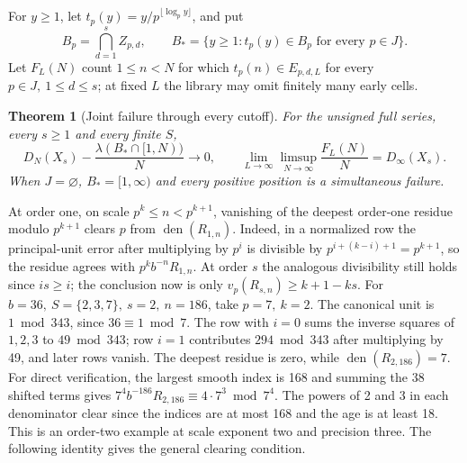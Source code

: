 \documentclass[11pt]{article}
\newtheorem{theorem}{Theorem}[section]
\newcommand{\vol}{\lambda}
\newcommand{\dd}{D_{\infty}}
\newcommand{\den}{\operatorname{den}}
\begin{document}
For \(y\ge1\), let \(t_p(y)=y/p^{\lfloor\log_p y\rfloor}\), and put
\[
 B_p=\bigcap_{d=1}^s Z_{p,d},\qquad
 B_*=\{y\ge1:t_p(y)\in B_p\text{ for every }p\in J\}.
\]
Let \(F_L(N)\) count \(1\le n<N\) for which \(t_p(n)\in E_{p,d,L}\) for every \(p\in J,\ 1\le d\le s\); at fixed \(L\) the library may omit finitely many early cells.

\begin{theorem}[Joint failure through every cutoff]\label{thm:joint}
For the unsigned full series, every \(s\ge1\) and every finite \(S\),
\begin{equation}\label{eq:joint}
 D_N(X_s)-\frac{\vol(B_*\cap[1,N))}{N}\longrightarrow0,\qquad
 \lim_{L\to\infty}\limsup_{N\to\infty}\frac{F_L(N)}N=\dd(X_s).
\end{equation}
When \(J=\varnothing\), \(B_*=[1,\infty)\) and every positive position is a simultaneous failure.
\end{theorem}

At order one, on scale \(p^k\le n<p^{k+1}\), vanishing of the deepest order-one residue modulo \(p^{k+1}\) clears \(p\) from \(\den(R_{1,n})\). Indeed, in a normalized row the principal-unit error after multiplying by \(p^i\) is divisible by \(p^{i+(k-i)+1}=p^{k+1}\), so the residue agrees with \(p^kb^{-n}R_{1,n}\). At order \(s\) the analogous divisibility still holds since \(is\ge i\); the conclusion now is only \(v_p(R_{s,n})\ge k+1-ks\). For \(b=36,\ S=\{2,3,7\},\ s=2,\ n=186\), take \(p=7,\ k=2\). The canonical unit is \(1\bmod343\), since \(36\equiv1\bmod7\). The row with \(i=0\) sums the inverse squares of \(1,2,3\) to \(49\bmod343\); row \(i=1\) contributes \(294\bmod343\) after multiplying by 49, and later rows vanish. The deepest residue is zero, while \(\den(R_{2,186})=7\). For direct verification, the largest smooth index is 168 and summing the 38 shifted terms gives \(7^4 b^{-186}R_{2,186}\equiv4\cdot7^3\bmod7^4\). The powers of 2 and 3 in each denominator clear since the indices are at most 168 and the age is at least 18. This is an order-two example at scale exponent two and precision three. The following identity gives the general clearing condition.
\end{document}
